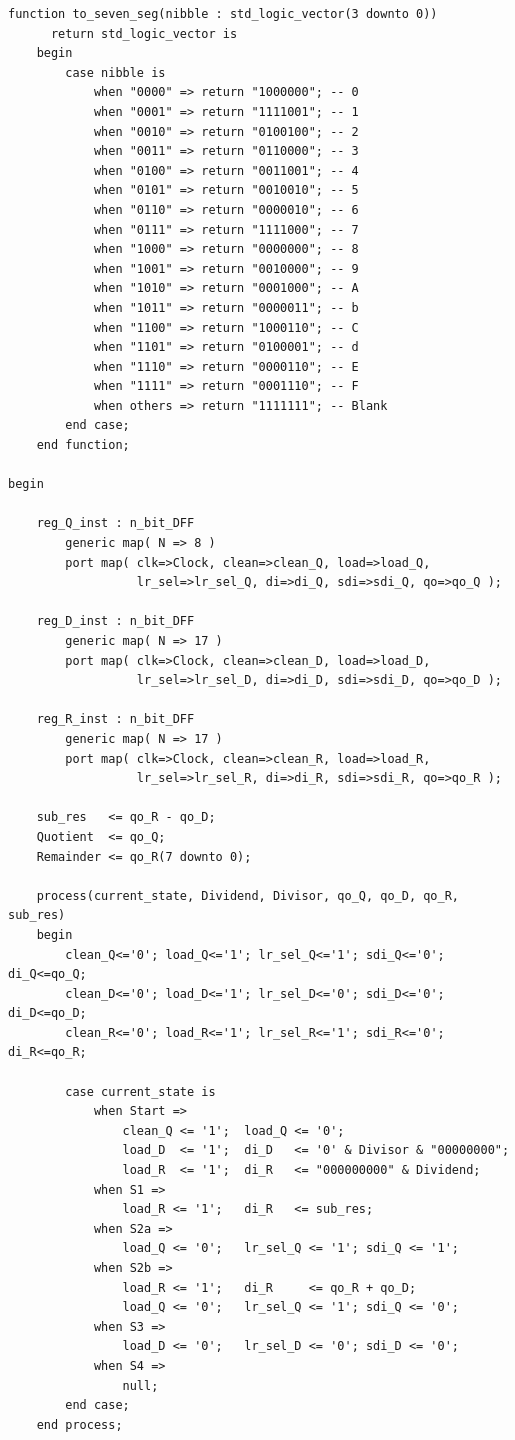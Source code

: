 \documentclass[12pt, a4paper]{article}
\begin{document}
\begin{lstlisting}[style=vhdlstyle, caption={Division.vhd --- 8-bit 恢復除法器頂層模組（結構化架構）}]
    function to_seven_seg(nibble : std_logic_vector(3 downto 0))
      return std_logic_vector is
    begin
        case nibble is
            when "0000" => return "1000000"; -- 0
            when "0001" => return "1111001"; -- 1
            when "0010" => return "0100100"; -- 2
            when "0011" => return "0110000"; -- 3
            when "0100" => return "0011001"; -- 4
            when "0101" => return "0010010"; -- 5
            when "0110" => return "0000010"; -- 6
            when "0111" => return "1111000"; -- 7
            when "1000" => return "0000000"; -- 8
            when "1001" => return "0010000"; -- 9
            when "1010" => return "0001000"; -- A
            when "1011" => return "0000011"; -- b
            when "1100" => return "1000110"; -- C
            when "1101" => return "0100001"; -- d
            when "1110" => return "0000110"; -- E
            when "1111" => return "0001110"; -- F
            when others => return "1111111"; -- Blank
        end case;
    end function;

begin

    reg_Q_inst : n_bit_DFF
        generic map( N => 8 )
        port map( clk=>Clock, clean=>clean_Q, load=>load_Q,
                  lr_sel=>lr_sel_Q, di=>di_Q, sdi=>sdi_Q, qo=>qo_Q );

    reg_D_inst : n_bit_DFF
        generic map( N => 17 )
        port map( clk=>Clock, clean=>clean_D, load=>load_D,
                  lr_sel=>lr_sel_D, di=>di_D, sdi=>sdi_D, qo=>qo_D );

    reg_R_inst : n_bit_DFF
        generic map( N => 17 )
        port map( clk=>Clock, clean=>clean_R, load=>load_R,
                  lr_sel=>lr_sel_R, di=>di_R, sdi=>sdi_R, qo=>qo_R );

    sub_res   <= qo_R - qo_D;
    Quotient  <= qo_Q;
    Remainder <= qo_R(7 downto 0);

    process(current_state, Dividend, Divisor, qo_Q, qo_D, qo_R, sub_res)
    begin
        clean_Q<='0'; load_Q<='1'; lr_sel_Q<='1'; sdi_Q<='0'; di_Q<=qo_Q;
        clean_D<='0'; load_D<='1'; lr_sel_D<='0'; sdi_D<='0'; di_D<=qo_D;
        clean_R<='0'; load_R<='1'; lr_sel_R<='1'; sdi_R<='0'; di_R<=qo_R;

        case current_state is
            when Start =>
                clean_Q <= '1';  load_Q <= '0';
                load_D  <= '1';  di_D   <= '0' & Divisor & "00000000";
                load_R  <= '1';  di_R   <= "000000000" & Dividend;
            when S1 =>
                load_R <= '1';   di_R   <= sub_res;
            when S2a =>
                load_Q <= '0';   lr_sel_Q <= '1'; sdi_Q <= '1';
            when S2b =>
                load_R <= '1';   di_R     <= qo_R + qo_D;
                load_Q <= '0';   lr_sel_Q <= '1'; sdi_Q <= '0';
            when S3 =>
                load_D <= '0';   lr_sel_D <= '0'; sdi_D <= '0';
            when S4 =>
                null;
        end case;
    end process;


\end{lstlisting}
\end{document}
